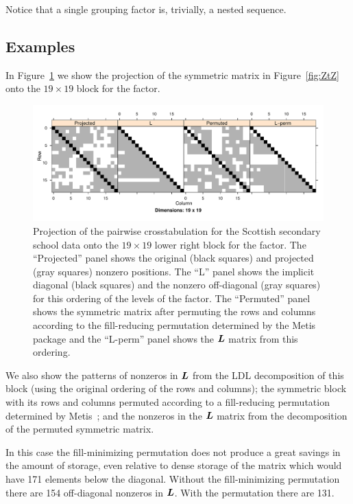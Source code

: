 \documentclass[12pt]{article}
\begin{document}
Notice that a single grouping factor is, trivially, a nested sequence.


\subsection{Examples}
\label{ssec:ProjectionEx}

In Figure~\ref{fig:ScotsProj} we show the projection of the symmetric
matrix in Figure~\ref{fig:ZtZ} onto the $19\times19$ block for the
 factor.
\begin{figure}[tbp]
  \centering
{}
\includegraphics{MixedEffects-FigScotsProj}
  \caption{Projection of the pairwise crosstabulation for the Scottish
    secondary school data onto the $19\times 19$ lower right block for
    the  factor.  The ``Projected'' panel shows the
    original (black squares) and projected (gray squares) nonzero
    positions.  The ``L'' panel shows the implicit diagonal (black
    squares) and the nonzero off-diagonal (gray squares) for this
    ordering of the levels of the factor.  The ``Permuted'' panel
    shows the symmetric matrix after permuting the rows and columns
    according to the fill-reducing permutation determined by the Metis
    package and the ``L-perm'' panel shows the $\bm{L}$ matrix from this
    ordering.}
  \label{fig:ScotsProj}
\end{figure}
We also show the patterns of nonzeros in $\bm{L}$ from the LDL
decomposition of this block (using the original ordering of the rows and
columns); the symmetric block with its rows and columns permuted
according to a fill-reducing permutation determined by
Metis~\citep{Metis}; and the nonzeros in the $\bm{L}$ matrix from the
decomposition of the permuted symmetric matrix.

In this case the fill-minimizing permutation does not produce a great
savings in the amount of storage, even relative to dense storage of
the matrix which would have 171 elements below the diagonal.
Without the fill-minimizing permutation there are 154 off-diagonal
nonzeros in $\bm{L}$.  With the permutation there are 131.
\end{document}
